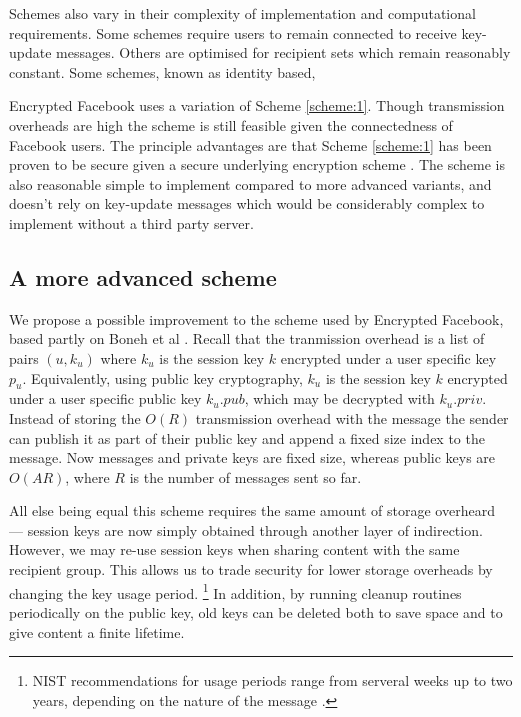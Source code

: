 Schemes also vary in their complexity of implementation and computational requirements. Some schemes require users to remain connected to receive key-update messages. Others are optimised for recipient sets which remain reasonably constant. Some schemes, known as identity based, 

Encrypted Facebook uses a variation of Scheme \ref{scheme:1}. Though transmission overheads are high the scheme is still feasible given the connectedness of Facebook users. The principle advantages are that Scheme \ref{scheme:1} has been proven to be secure given a secure underlying encryption scheme \cite{survey}. The scheme is also reasonable simple to implement compared to more advanced variants, and doesn't rely on key-update messages which would be considerably complex to implement without a third party server.

\subsection{A more advanced scheme}
\label{ssec:bcast-improved}

We propose a possible improvement to the scheme used by Encrypted Facebook, based partly on Boneh et al \cite{boneh}. Recall that the tranmission overhead is a list of pairs $(u, k_u)$ where $k_u$ is the session key $k$ encrypted under a user specific key $p_u$. Equivalently, using public key cryptography, $k_u$ is the session key $k$ encrypted under a user specific public key $k_u.pub$, which may be decrypted with $k_u.priv$. Instead of storing the $O(R)$ transmission overhead with the message the sender can publish it as part of their public key and append a fixed size index to the message. Now messages and private keys are fixed size, whereas public keys are $O(AR)$, where $R$ is the number of messages sent so far. 

All else being equal this scheme requires the same amount of storage overheard --- session keys are now simply obtained through another layer of indirection. However, we may re-use session keys when sharing content with the same recipient group. This allows us to trade security for lower storage overheads by changing the key usage period. \footnote{NIST recommendations for usage periods range from serveral weeks up to two years, depending on the nature of the message \cite{nist-key}.} In addition, by running cleanup routines periodically on the public key, old keys can be deleted both to save space and to give content a finite lifetime.